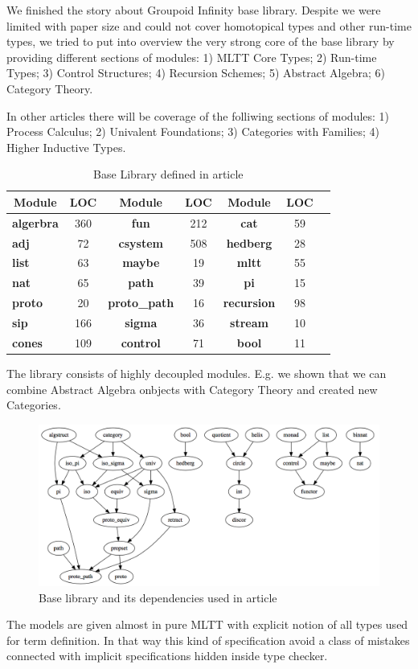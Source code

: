 \documentclass{article}
\newcommand*{\thead}[1]{\multicolumn{1}{c}{\bfseries #1}}
\begin{document}
We finished the story about Groupoid Infinity base library.
Despite we were limited with paper size and could not cover
homotopical types and other run-time types, we tried to put
into overview the very strong core of the base library by
providing different sections of modules:
1) MLTT Core Types;
2) Run-time Types;
3) Control Structures;
4) Recursion Schemes;
5) Abstract Algebra;
6) Category Theory.

In other articles there will be coverage of the folliwing sections of modules:
1) Process Calculus;
2) Univalent Foundations;
3) Categories with Families;
4) Higher Inductive Types.

\begin{table}[h]
\centering
\caption{Base Library defined in article}
\label{tab:a}
\begin{tabular}{lcccccc}
\hline
\thead{Module}&\thead{LOC}&\thead{Module}&\thead{LOC}&\thead{Module}&\thead{LOC} \\
\hline
{\bf algerbra} & 360 & {\bf fun}         & 212 & {\bf cat}       & 59  \\
{\bf adj}      & 72  & {\bf csystem}     & 508 & {\bf hedberg}   & 28  \\
{\bf list}     & 63  & {\bf maybe}       & 19  & {\bf mltt}      & 55  \\
{\bf nat}      & 65  & {\bf path}        & 39  & {\bf pi}        & 15  \\
{\bf proto}    & 20  & {\bf proto\_path} & 16  & {\bf recursion} & 98  \\
{\bf sip}      & 166 & {\bf sigma}       & 36  & {\bf stream}    & 10  \\
{\bf cones}    & 109 & {\bf control}     & 71  & {\bf bool}      & 11  \\
\hline
\end{tabular}
\end{table}

The library consists of highly decoupled modules. E.g. we shown that we can combine
Abstract Algebra onbjects with Category Theory and created new Categories.

\begin{figure}[h]
  \centerline{\includegraphics[scale=0.20]{baselib}}
  \caption{Base library and its dependencies used in article}
\end{figure}

The models are given almost in pure MLTT with explicit notion of all types used
for term definition. In that way this kind of specification avoid a class of mistakes
connected with implicit specifications hidden inside type checker.

\newpage


\end{document}
